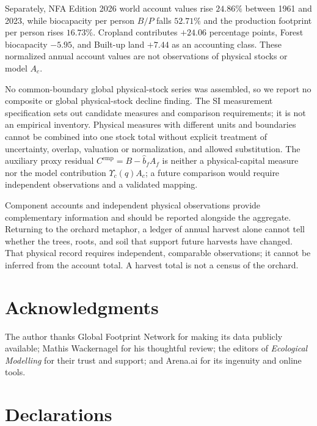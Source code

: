 \documentclass[preprint,12pt,authoryear]{elsarticle}
\newcommand{\Ups}{\Upsilon_c}
\begin{document}
Separately, NFA Edition 2026 world account values rise $24.86\%$ between 1961 and 2023, while biocapacity per person $B/P$ falls $52.71\%$ and the production footprint per person rises $16.73\%$. Cropland contributes $+24.06$ percentage points, Forest biocapacity $-5.95$, and Built-up land $+7.44$ as an accounting class. These normalized annual account values are not observations of physical stocks or model $A_c$.

\begin{samepage}
No common-boundary global physical-stock series was assembled, so we report no composite or global physical-stock decline finding. The SI measurement specification sets out candidate measures and comparison requirements; it is not an empirical inventory. Physical measures with different units and boundaries cannot be combined into one stock total without explicit treatment of uncertainty, overlap, valuation or normalization, and allowed substitution. The auxiliary proxy residual $C^{\mathrm{emp}}=B-\hat b_fA_f$ is neither a physical-capital measure nor the model contribution $\Ups(q)A_c$; a future comparison would require independent observations and a validated mapping.\par
\end{samepage}

Component accounts and independent physical observations provide complementary information and should be reported alongside the aggregate. Returning to the orchard metaphor, a ledger of annual harvest alone cannot tell whether the trees, roots, and soil that support future harvests have changed. That physical record requires independent, comparable observations; it cannot be inferred from the account total. A harvest total is not a census of the orchard.

\section*{Acknowledgments}

The author thanks Global Footprint Network for making its data publicly available; Mathis Wackernagel for his thoughtful review; the editors of \emph{Ecological Modelling} for their trust and support; and Arena.ai for its ingenuity and online tools.

\section*{Declarations}
\end{document}

